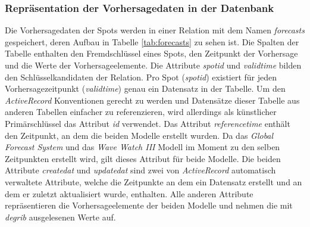 \subsubsection{Repräsentation der Vorhersagedaten in der Datenbank}
Die Vorhersagedaten der Spots werden in einer Relation mit dem Namen
\textit{forecasts} gespeichert, deren Aufbau in Tabelle
\ref{tab:forecasts} zu sehen ist. Die Spalten der Tabelle enthalten
den Fremdschlüssel eines Spots, den Zeitpunkt der Vorhersage und die
Werte der Vorhersageelemente. Die Attribute
\textit{spot\textunderscore id} und \textit{valid\textunderscore time}
bilden den Schlüsselkandidaten der Relation. Pro Spot
(\textit{spot\textunderscore id}) existiert für jeden
Vorhersagezeitpunkt (\textit{valid\textunderscore time}) genau ein
Datensatz in der Tabelle. Um den \textit{ActiveRecord} Konventionen
gerecht zu werden und Datensätze dieser Tabelle aus anderen Tabellen
einfacher zu referenzieren, wird allerdings als künstlicher
Primärschlüssel das Attribut \textit{id} verwendet. Das Attribut
\textit{reference\textunderscore time} enthält den Zeitpunkt, an dem
die beiden Modelle erstellt wurden. Da das \textit{Global Forecast
  System} und das \textit{Wave Watch III} Modell im Moment zu den
selben Zeitpunkten erstellt wird, gilt dieses Attribut für beide
Modelle. Die beiden Attribute \textit{created\textunderscore at} und
\textit{updated\textunderscore at} sind zwei von \textit{ActiveRecord}
automatisch verwaltete Attribute, welche die Zeitpunkte an dem ein
Datensatz erstellt und an dem er zuletzt aktualisiert wurde,
enthalten. Alle anderen Attribute repräsentieren die
Vorhersageelemente der beiden Modelle und nehmen die mit
\textit{degrib} ausgelesenen Werte auf.

